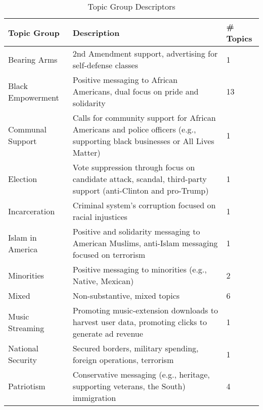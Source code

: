 \documentclass{article}
\begin{document}
\begin{table}[!htb]
	\centering
	\renewcommand\arraystretch{1.1}
	\begin{spacing}{1}
		\caption{Topic Group Descriptors}
		\begin{tabular}{Y{3.5cm}Y{10cm}p{1.5cm}}
			\toprule
			Topic Group       & Description                                                                                                                   & \# Topics \tabularnewline
			\midrule
			Bearing Arms      & 2nd Amendment support, advertising for self-defense classes                                                                   & 1         \tabularnewline
			\addlinespace[0.1cm]
			Black Empowerment & Positive messaging to African Americans, dual focus on pride and solidarity~                                                  & 13        \tabularnewline
			\addlinespace[0.1cm]
			Communal Support  & Calls for community support for African Americans and police officers (e.g., supporting black businesses or All Lives Matter) & 1         \tabularnewline
			\addlinespace[0.1cm]
			Election          & Vote suppression through focus on candidate attack, scandal, third-party support (anti-Clinton and pro-Trump)                 & 1         \tabularnewline
			\addlinespace[0.1cm]
			Incarceration     & Criminal system's corruption focused on racial injustices                                                                     & 1         \tabularnewline
			\addlinespace[0.1cm]
			Islam in America  & Positive and solidarity messaging to American Muslims, anti-Islam messaging focused on terrorism                              & 1         \tabularnewline
			\addlinespace[0.1cm]
			Minorities        & Positive messaging to minorities (e.g., Native, Mexican)                                                                      & 2         \tabularnewline
			\addlinespace[0.1cm]
			Mixed             & Non-substantive, mixed topics                                                                                                 & 6         \tabularnewline
			\addlinespace[0.1cm]
			Music Streaming   & Promoting music-extension downloads to harvest user data, promoting clicks to generate ad revenue                             & 1         \tabularnewline
			\addlinespace[0.1cm]
			National Security & Secured borders, military spending, foreign operations, terrorism                                                             & 1         \tabularnewline
			\addlinespace[0.1cm]
			Patriotism        & Conservative messaging (e.g., heritage, supporting veterans, the South) immigration                                           & 4         \tabularnewline

\end{tabular}
\end{spacing}
\end{table}
\end{document}
